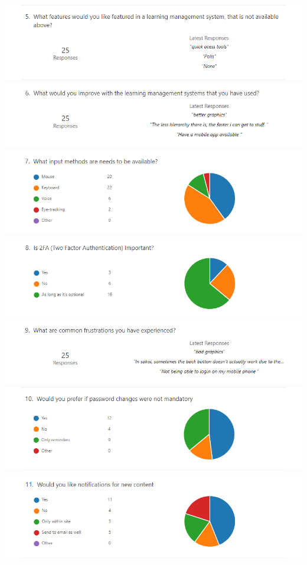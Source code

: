 \documentclass[12pt]{article}
\begin{document}
    \includegraphics[width=\textwidth]{survey/5.png}
    \includegraphics[width=\textwidth]{survey/6.png}
    \includegraphics[width=\textwidth]{survey/7.png}
    \includegraphics[width=\textwidth]{survey/8.png}
    \includegraphics[width=\textwidth]{survey/9.png}
    \includegraphics[width=\textwidth]{survey/10.png}
    \includegraphics[width=\textwidth]{survey/11.png}
\end{document}
